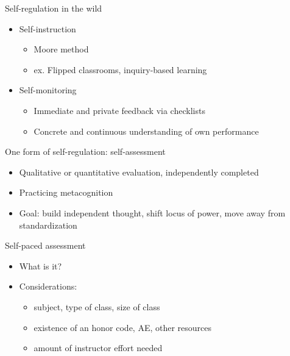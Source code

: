 \documentclass{beamer}
\begin{document}
\begin{frame}{Self-regulation in the wild}
  \begin{itemize}
    \item Self-instruction
    \begin{itemize}
      \item Moore method
      \item ex. Flipped classrooms, inquiry-based learning
    \end{itemize}
    \item Self-monitoring
    \begin{itemize}
      \item Immediate and private feedback via checklists
      \item Concrete and continuous understanding of own performance
    \end{itemize}
  \end{itemize}
\end{frame}
\begin{frame}{One form of self-regulation: self-assessment}
  \begin{itemize}
    \item Qualitative or quantitative evaluation, independently completed
    \item Practicing metacognition \pause
    \item Goal: build independent thought, shift locus of power, move away from standardization
  \end{itemize}
\end{frame}
\begin{frame}{Self-paced assessment}
  \begin{itemize}
    \item What is it?\pause
    \item Considerations:
    \begin{itemize}
      \item subject, type of class, size of class
      \item existence of an honor code, AE, other resources
      \item amount of instructor effort needed
    \end{itemize}
  \end{itemize}
\end{frame}
\end{document}
